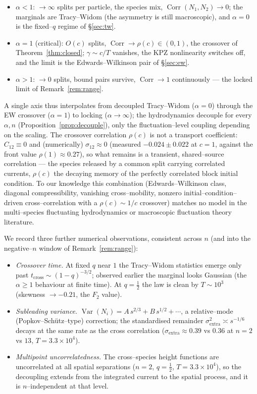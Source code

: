 \documentclass[11pt]{article}
\theoremstyle{plain}
\theoremstyle{definition}
\theoremstyle{remark}
\DeclareMathOperator{\Var}{Var}\DeclareMathOperator{\Cov}{Cov}
\DeclareMathOperator{\Corr}{Corr}\DeclareMathOperator{\cum}{cum}
\begin{document}
\begin{itemize}
\item $\alpha<1$: $\to\infty$ splits per particle, the species mix,
$\Corr(N_1,N_2)\to0$; the marginals are Tracy--Widom (the asymmetry is still
macroscopic), and $\alpha=0$ is the fixed--$q$ regime of \S\ref{sec:tw}.
\item $\alpha=1$ (critical): $O(c)$ splits, $\Corr\to\rho(c)\in(0,1)$, the crossover of
Theorem~\ref{thm:closed}; $\gamma\sim c/T$ vanishes, the KPZ nonlinearity switches off,
and the limit is the Edwards--Wilkinson pair of \S\ref{sec:ew}.
\item $\alpha>1$: $\to0$ splits, bound pairs survive, $\Corr\to1$ continuously --- the
locked limit of Remark~\ref{rem:range}.
\end{itemize}

\noindent A single axis thus interpolates from decoupled Tracy--Widom ($\alpha=0$)
through the EW crossover ($\alpha=1$) to locking ($\alpha\to\infty$); the hydrodynamics
decouple for every $\alpha,n$ (Proposition~\ref{prop:decouple}), only the
fluctuation--level coupling depending on the scaling. The crossover correlation
$\rho(c)$ is not a transport coefficient: $C_{12}\equiv0$ and (numerically)
$\sigma_{12}\approx0$ (measured $-0.024\pm0.022$ at $c=1$, against the front value
$\rho(1)\approx0.27$), so what remains is a transient, shared--source correlation --- the
species released by a common split carrying correlated currents, $\rho(c)$ the decaying
memory of the perfectly correlated block initial condition. To our knowledge this
combination (Edwards--Wilkinson class, diagonal compressibility, vanishing
cross--mobility, nonzero initial--condition--driven cross--correlation with a
$\rho(c)\sim1/c$ crossover) matches no model in the multi--species fluctuating
hydrodynamics or macroscopic fluctuation theory literature.

We record three further numerical observations, consistent across $n$ (and into the
negative--$n$ window of Remark~\ref{rem:range}):
\begin{itemize}
\item \emph{Crossover time.} At fixed $q$ near $1$ the Tracy--Widom statistics emerge only
past $t_{\mathrm{cross}}\sim(1-q)^{-3/2}$; observed earlier the marginal looks Gaussian
(the $\alpha\ge1$ behaviour at finite time). At $q=\tfrac12$ the law is clean by
$T\sim10^3$ (skewness $\to-0.21$, the $F_2$ value).
\item \emph{Subleading variance.} $\Var(N_i)=A\,s^{2/3}+B\,s^{1/2}+\cdots$, a
relative--mode (Popkov--Sch\"utz--type) correction; the standardised remainder
$\sigma_{\mathrm{extra}}^2\asymp s^{-1/6}$ decays at the same rate as the cross
correlation ($\sigma_{\mathrm{extra}}\approx0.39$ vs $0.36$ at $n=2$ vs $13$,
$T=3.3\times10^4$).
\item \emph{Multipoint uncorrelatedness.} The cross--species height functions are
uncorrelated at all spatial separations ($n=2$, $q=\tfrac12$, $T=3.3\times10^4$), so
the decoupling extends from the integrated current to the spatial process, and it is
$n$--independent at that level.
\end{itemize}
\end{document}
